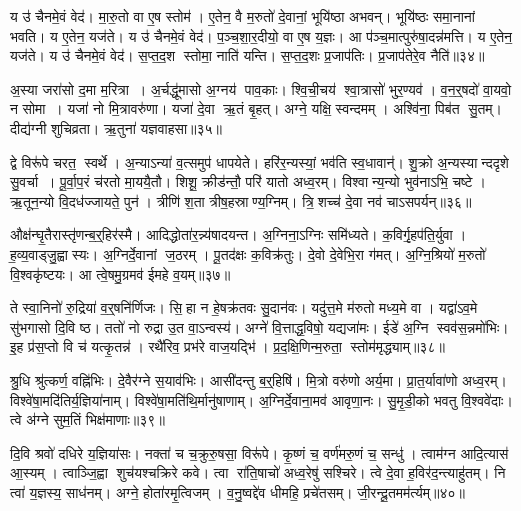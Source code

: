 य उ॑ चैनमे॒वं वेद॑।
मा॒रु॒तो वा ए॒ष स्तोम॑।
ए॒तेन॒ वै म॒रुतो॑ दे॒वानां॒ भूयि॑ष्ठा अभवन्।
भूयि॑ष्ठः समा॒नानां भवति।
य ए॒तेन॒ यज॑ते।
य उ॑ चैनमे॒वं वेद॑।
प॒ञ्च॒शा॒र॒दीयो॒ वा ए॒ष य॒ज्ञः।
आ प॑ञ्च॒मात्पुरु॑षा॒दन्न॑मत्ति।
य ए॒तेन॒ यज॑ते।
य उ॑ चैनमे॒वं वेद॑।
स॒प्त॒द॒श स्तोमा॒ नाति॑ यन्ति।
स॒प्त॒द॒शः प्र॒जाप॑तिः।
प्र॒जाप॑तेरे॒व नैति॑॥३४॥\anuvakamend[तृ॒तीये॑ गच्छति॒ य ए॒तेन॒ यज॑तेऽत्ति॒ य ए॒तेन॒ यज॑ते॒ य उ॑ चैनमे॒वं वेद॒ त्रीणि॑ च (अ॒गस्त्य॒ स्वाराज्यं मारु॒तः प॑ञ्चशार॒दीयो॒ वा ए॒ष य॒ज्ञः स॑प्तद॒शं प्र॒जाप॑तेरे॒व नैति॑ ॥ )]

अ॒स्या जरा॑सो द॒मा म॒रित्रा।
अ॒र्चद्धू॑मासो अ॒ग्नय॑ पाव॒काः।
श्वि॒ची॒चय॑ श्वा॒त्रासो॑ भुर॒ण्यव॑।
व॒न॒र्॒षदो॑ वा॒यवो॒ न सोमा।
यजा॑ नो मि॒त्रावरु॑णा।
यजा॑ दे॒वा ऋ॒तं बृ॒हत्।
अग्ने॒ यक्षि॒ स्वन्दमम्।
अश्वि॑ना॒ पिब॑त सु॒तम्।
दीद्य॑ग्नी शुचिव्रता।
ऋ॒तुना॑ यज्ञवाहसा॥३५॥

द्वे विरू॑पे चरत॒ स्वर्थे।
अ॒न्याऽन्या॑ व॒त्समुप॑ धापयेते।
हरि॑र॒न्यस्यां॒ भव॑ति स्व॒धावान्॑।
शु॒क्रो अ॒न्यस्यान्ददृशे सु॒वर्चा।
पू॒र्वा॒प॒रं च॑रतो मा॒ययै॒तौ।
शिशू॒ क्रीड॑न्तौ॒ परि॑ यातो अध्व॒रम्।
विश्वान्य॒न्यो भुव॑नाऽभि॒ चष्टे।
ऋ॒तून॒न्यो वि॒दध॑ज्जायते॒ पुन॑।
त्रीणि॑ श॒ता त्रीष॒हस्राण्य॒ग्निम्।
त्रि॒शच्च॑ दे॒वा नव॑ चाऽसपर्यन्॥३६॥

औक्ष॑न्घृ॒तैरास्तृ॑णन्ब॒र्॒हिर॑स्मै।
आदिद्धोता॑र॒न्न्य॑षादयन्त।
अ॒ग्निना॒ऽग्निः समि॑ध्यते।
क॒विर्गृ॒हप॑ति॒र्युवा।
ह॒व्य॒वाड्जु॒ह्वास्यः।
अ॒ग्निर्दे॒वानां ज॒ठरम्।
पू॒तद॑क्षः क॒विक्र॑तुः।
दे॒वो दे॒वेभि॒रा ग॑मत्।
अ॒ग्नि॒श्रियो॑ म॒रुतो॑ वि॒श्वकृ॑ष्टयः।
आ त्वे॒षमु॒ग्रमव॑ ईमहे व॒यम्॥३७॥

ते स्वा॒निनो॑ रु॒द्रिया॑ व॒र्॒षनि॑र्णिजः।
सि॒हा न हे॒षक्र॑तवः सु॒दान॑वः।
यदु॑त्त॒मे म॑रुतो मध्य॒मे वा।
यद्वा॑ऽव॒मे सु॑भगासो दि॒वि ष्ठ।
ततो॑ नो रुद्रा उ॒त वा॒ऽन्वस्य॑।
अग्ने॑ वि॒त्ताद्ध॒विषो॒ यद्यजा॑मः।
ईडे॑ अ॒ग्नि स्वव॑स॒न्नमो॑भिः।
इ॒ह प्र॑स॒प्तो वि च॑ यत्कृ॒तन्न॑।
रथै॑रिव॒ प्रभ॑रे वाज॒यद्भि॑।
प्र॒द॒क्षि॒णिन्म॒रुता॒ स्तोम॑मृद्ध्याम्॥३८॥

श्रु॒धि श्रु॑त्कर्ण॒ वह्नि॑भिः।
दे॒वैर॑ग्ने स॒याव॑भिः।
आसी॑दन्तु ब॒र्॒हिषि॑।
मि॒त्रो वरु॑णो अर्य॒मा।
प्रा॒त॒र्यावा॑णो अध्व॒रम्।
विश्वे॑षा॒मदि॑तिर्य॒ज्ञिया॑नाम्।
विश्वे॑षा॒मति॑थि॒र्मानु॑षाणाम्।
अ॒ग्निर्दे॒वाना॒मव॑ आवृणा॒नः।
सु॒मृ॒डी॒को भवतु वि॒श्ववे॑दाः।
त्वे अ॑ग्ने सुम॒तिं भिक्ष॑माणाः॥३९॥

दि॒वि श्रवो॑ दधिरे य॒ज्ञिया॑सः।
नक्ता॑ च च॒क्रुरु॒षसा॒ विरू॑पे।
कृ॒ष्णं च॒ वर्ण॑मरु॒णं च॒ सन्धु॑।
त्वाम॑ग्न आदि॒त्यास॑ आ॒स्यम्।
त्वाञ्जि॒ह्वा शुच॑यश्चक्रिरे कवे।
त्वा रा॑ति॒षाचो॑ अध्व॒रेषु॑ सश्चिरे।
त्वे दे॒वा ह॒विर॑द॒न्त्याहु॑तम्।
नि त्वा॑ य॒ज्ञस्य॒ साध॑नम्।
अग्ने॒ होता॑रमृ॒त्विजम्।
व॒नु॒ष्वद्दे॑व धीमहि॒ प्रचे॑तसम्।
जी॒रन्दू॒तमम॑र्त्यम्॥४०॥\anuvakamend[य॒ज्ञ॒वा॒ह॒सा॒स॒प॒र्य॒न्व॒यमृ॑द्ध्यां॒ भिक्ष॑माणा॒ प्रचे॑तस॒मेकं च]

